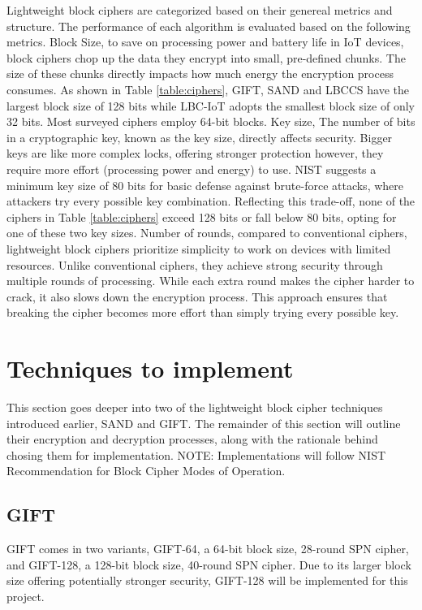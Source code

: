\documentclass[conference]{IEEEtran}
\begin{document}
Lightweight block ciphers are categorized based on their genereal metrics and structure. The performance of each algorithm is evaluated based on the following metrics.
Block Size, to save on processing power and battery life in IoT devices, block ciphers chop up the data they encrypt into small, pre-defined chunks. The size of these chunks directly impacts how much energy the encryption process consumes. As shown in Table \ref{table:ciphers}, GIFT, SAND and LBCCS have the largest block size of 128 bits while LBC-IoT adopts the smallest block size of only 32 bits. Most surveyed ciphers employ 64-bit blocks.
Key size, The number of bits in a cryptographic key, known as the key size, directly affects security. Bigger keys are like more complex locks, offering stronger protection however, they require more effort (processing power and energy) to use. NIST suggests a minimum key size of 80 bits for basic defense against brute-force attacks, where attackers try every possible key combination\cite{barker2018transitioning}. Reflecting this trade-off, none of the ciphers in Table \ref{table:ciphers} exceed 128 bits or fall below 80 bits, opting for one of these two key sizes.
Number of rounds, compared to conventional ciphers, lightweight block ciphers prioritize simplicity to work on devices with limited resources. Unlike conventional ciphers, they achieve strong security through multiple rounds of processing. While each extra round makes the cipher harder to crack, it also slows down the encryption process. This approach ensures that breaking the cipher becomes more effort than simply trying every possible key.

\section{Techniques to implement} \label{tecnicas}

This section goes deeper into two of the lightweight block cipher techniques introduced earlier, SAND and GIFT. The remainder of this section will outline their encryption and decryption processes, along with the rationale behind chosing them for implementation. NOTE: Implementations will follow NIST Recommendation for Block
Cipher Modes of Operation\cite{dworkin2001recommendation}.

\subsection{GIFT}

GIFT comes in two variants, GIFT-64, a 64-bit block size, 28-round SPN cipher, and GIFT-128, a 128-bit block size, 40-round SPN cipher. Due to its larger block size offering potentially stronger security, GIFT-128 will be implemented for this project\cite{yasmin2023modified}.
\end{document}
